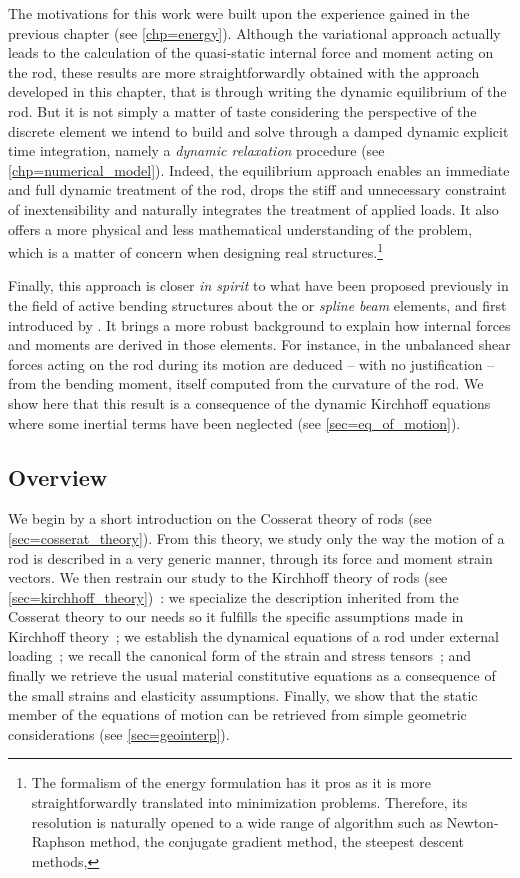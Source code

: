 The motivations for this work were built upon the experience gained in the previous chapter (see \cref{chp=energy}). Although the variational approach actually leads to the calculation of the quasi-static internal force and moment acting on the rod, these results are more straightforwardly obtained with the approach developed in this chapter, that is through writing the dynamic equilibrium of the rod. But it is not simply a matter of taste considering the perspective of the discrete element we intend to build and solve through a damped dynamic explicit time integration, namely a \emph{dynamic relaxation} procedure (see \cref{chp=numerical_model}). Indeed, the equilibrium approach enables an immediate and full dynamic treatment of the rod, drops the stiff and unnecessary constraint of inextensibility and naturally integrates the treatment of applied loads. It also offers a more physical and less mathematical understanding of the problem, which is a matter of concern when designing real structures.\footnote{The formalism of the energy formulation has it pros as it is more straightforwardly translated into minimization problems. Therefore, its resolution is naturally opened to a wide range of algorithm such as Newton-Raphson method, the conjugate gradient method, the steepest descent methods, \telp{}}

Finally, this approach is closer \emph{in spirit} to what have been proposed previously in the field of active bending structures about the  or  \emph{spline beam} elements, and first introduced by . It brings a more robust background to explain how internal forces and moments are derived in those elements. For instance, in \cite{Adriaenssens2001,Douthe2006,DAmico2014} the unbalanced shear forces acting on the rod during its motion are deduced -- with no justification -- from the bending moment, itself computed from the curvature of the rod. We show here that this result is a consequence of the dynamic Kirchhoff equations where some inertial terms have been neglected (see \cref{sec=eq_of_motion}).

\subsection{Overview}

We begin by a short introduction on the Cosserat theory of rods (see \cref{sec=cosserat_theory}). From this theory, we study only the way the motion of a rod is described in a very generic manner, through its force and moment strain vectors. We then restrain our study to the Kirchhoff theory of rods (see \cref{sec=kirchhoff_theory})~: we specialize the description inherited from the Cosserat theory to our needs so it fulfills the specific assumptions made in Kirchhoff theory~; we establish the dynamical equations of a rod under external loading~; we recall the canonical form of the strain and stress tensors~; and finally we retrieve the usual material constitutive equations as a consequence of the small strains and elasticity assumptions. Finally, we show that the static member of the equations of motion can be retrieved from simple geometric considerations (see \cref{sec=geointerp}).

